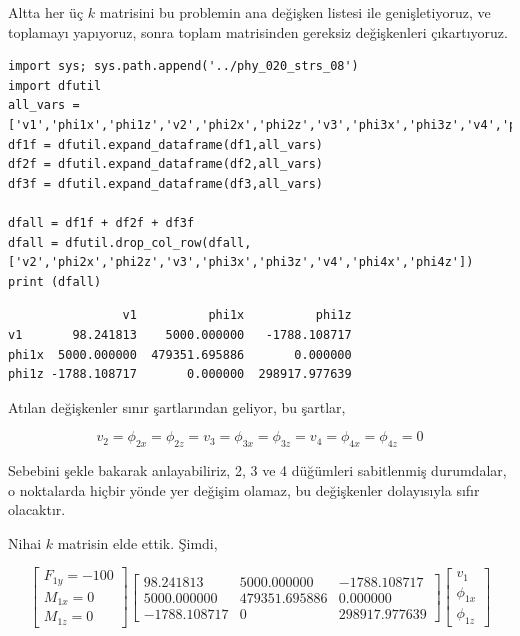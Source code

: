 \documentclass[12pt,fleqn]{article}\usepackage{../../common}
\begin{document}
Altta her üç $k$ matrisini bu problemin ana değişken listesi ile genişletiyoruz,
ve toplamayı yapıyoruz, sonra toplam matrisinden gereksiz değişkenleri
çıkartıyoruz.

\begin{verbatim}  
import sys; sys.path.append('../phy_020_strs_08')
import dfutil
all_vars = ['v1','phi1x','phi1z','v2','phi2x','phi2z','v3','phi3x','phi3z','v4','phi4x','phi4z']
df1f = dfutil.expand_dataframe(df1,all_vars)
df2f = dfutil.expand_dataframe(df2,all_vars)
df3f = dfutil.expand_dataframe(df3,all_vars)
  
dfall = df1f + df2f + df3f
dfall = dfutil.drop_col_row(dfall, ['v2','phi2x','phi2z','v3','phi3x','phi3z','v4','phi4x','phi4z'])
print (dfall)
\end{verbatim}

\begin{verbatim}
                v1          phi1x          phi1z
v1       98.241813    5000.000000   -1788.108717
phi1x  5000.000000  479351.695886       0.000000
phi1z -1788.108717       0.000000  298917.977639
\end{verbatim}

Atılan değişkenler sınır şartlarından geliyor, bu şartlar,

$$
v_2 = \phi_{2x} = \phi_{2z} = v_3 = \phi_{3x} = \phi_{3z} = v_4 = \phi_{4x} = \phi_{4z} = 0
$$

Sebebini şekle bakarak anlayabiliriz, 2, 3 ve 4 düğümleri sabitlenmiş
durumdalar, o noktalarda hiçbir yönde yer değişim olamaz, bu değişkenler
dolayısıyla sıfır olacaktır.

Nihai $k$ matrisin elde ettik. Şimdi,

$$
\left[\begin{array}{c}
F_{1y} = -100 \\ M_{1x} = 0 \\ M_{1z} = 0
\end{array}\right]
\left[\begin{array}{ccc}
   98.241813 &   5000.000000 &   -1788.108717 \\
 5000.000000 &  479351.695886 &       0.000000 \\
-1788.108717  &      0 &  298917.977639
\end{array}\right]
\left[\begin{array}{c}
v_1 \\ \phi_{1x} \\ \phi_{1z}
\end{array}\right]
$$
\end{document}
